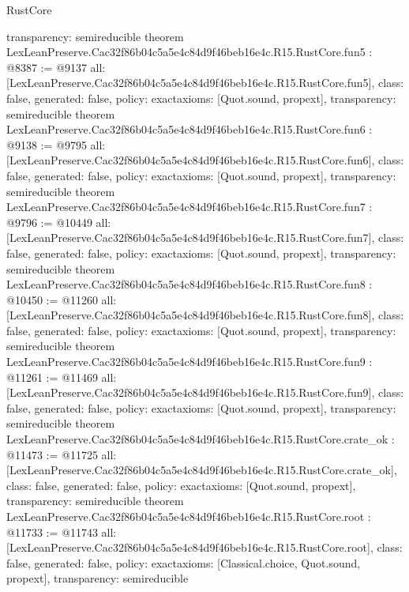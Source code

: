 \begin{lexlean}{RustCore}
\begin{coremodule}
{  transparency: semireducible
}
theorem LexLeanPreserve.Cac32f86b04c5a5e4c84d9f46beb16e4c.R15.RustCore.fun5 : @8387 := @9137 {
  all: [LexLeanPreserve.Cac32f86b04c5a5e4c84d9f46beb16e4c.R15.RustCore.fun5],
  class: false,
  generated: false,
  policy: exact{axioms: [Quot.sound, propext]},
  transparency: semireducible
}
theorem LexLeanPreserve.Cac32f86b04c5a5e4c84d9f46beb16e4c.R15.RustCore.fun6 : @9138 := @9795 {
  all: [LexLeanPreserve.Cac32f86b04c5a5e4c84d9f46beb16e4c.R15.RustCore.fun6],
  class: false,
  generated: false,
  policy: exact{axioms: [Quot.sound, propext]},
  transparency: semireducible
}
theorem LexLeanPreserve.Cac32f86b04c5a5e4c84d9f46beb16e4c.R15.RustCore.fun7 : @9796 := @10449 {
  all: [LexLeanPreserve.Cac32f86b04c5a5e4c84d9f46beb16e4c.R15.RustCore.fun7],
  class: false,
  generated: false,
  policy: exact{axioms: [Quot.sound, propext]},
  transparency: semireducible
}
theorem LexLeanPreserve.Cac32f86b04c5a5e4c84d9f46beb16e4c.R15.RustCore.fun8 : @10450 := @11260 {
  all: [LexLeanPreserve.Cac32f86b04c5a5e4c84d9f46beb16e4c.R15.RustCore.fun8],
  class: false,
  generated: false,
  policy: exact{axioms: [Quot.sound, propext]},
  transparency: semireducible
}
theorem LexLeanPreserve.Cac32f86b04c5a5e4c84d9f46beb16e4c.R15.RustCore.fun9 : @11261 := @11469 {
  all: [LexLeanPreserve.Cac32f86b04c5a5e4c84d9f46beb16e4c.R15.RustCore.fun9],
  class: false,
  generated: false,
  policy: exact{axioms: [Quot.sound, propext]},
  transparency: semireducible
}
theorem LexLeanPreserve.Cac32f86b04c5a5e4c84d9f46beb16e4c.R15.RustCore.crate_ok : @11473 := @11725 {
  all: [LexLeanPreserve.Cac32f86b04c5a5e4c84d9f46beb16e4c.R15.RustCore.crate_ok],
  class: false,
  generated: false,
  policy: exact{axioms: [Quot.sound, propext]},
  transparency: semireducible
}
theorem LexLeanPreserve.Cac32f86b04c5a5e4c84d9f46beb16e4c.R15.RustCore.root : @11733 := @11743 {
  all: [LexLeanPreserve.Cac32f86b04c5a5e4c84d9f46beb16e4c.R15.RustCore.root],
  class: false,
  generated: false,
  policy: exact{axioms: [Classical.choice, Quot.sound, propext]},
  transparency: semireducible
}


\end{coremodule}
\end{lexlean}
